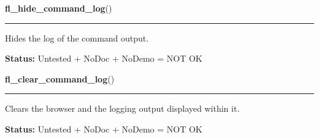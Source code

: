    \label{xformslib:flgoodies:fl_hide_command_log}

    \vspace{0.5ex}

\hspace{.8\funcindent}\begin{boxedminipage}{\funcwidth}

    \raggedright \textbf{fl\_hide\_command\_log}()

    \vspace{-1.5ex}

    \rule{\textwidth}{0.5\fboxrule}
\setlength{\parskip}{2ex}
    Hides the log of the command output.

\setlength{\parskip}{1ex}
\textbf{Status:} Untested + NoDoc + NoDemo = NOT OK



    \end{boxedminipage}

    \label{xformslib:flgoodies:fl_clear_command_log}

    \vspace{0.5ex}

\hspace{.8\funcindent}\begin{boxedminipage}{\funcwidth}

    \raggedright \textbf{fl\_clear\_command\_log}()

    \vspace{-1.5ex}

    \rule{\textwidth}{0.5\fboxrule}
\setlength{\parskip}{2ex}
    Clears the browser and the logging output displayed within it.

\setlength{\parskip}{1ex}
\textbf{Status:} Untested + NoDoc + NoDemo = NOT OK



    \end{boxedminipage}

    \label{xformslib:flgoodies:fl_addto_command_log}

    \vspace{0.5ex}

